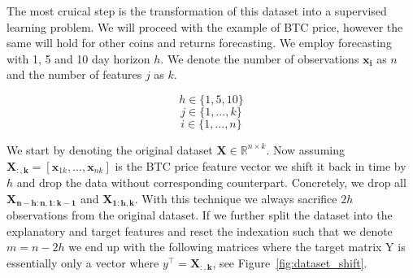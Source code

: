 The most cruical step is the transformation of this dataset into a supervised
learning problem. We will proceed with the example of BTC price, however
the same will hold for other coins and returns forecasting. We employ
forecasting with 1, 5 and 10 day horizon $h$. We denote the number 
of observations $\mathbf{x_{i}}$
as $n$ and the number of features $j$ as $k$.

\begin{equation}\label{eq:horizon}
    h \in \{1,5,10\}
\end{equation}
\begin{equation}\label{eq:features}
    j \in \{1,...,k\}
\end{equation}
\begin{equation}\label{eq:observations}
    i \in \{1,...,n\}
\end{equation}

We start by denoting
the original dataset $\mathbf{X} \in \mathbb{R}^{n \times k}$.
Now assuming $\mathbf{X_{:,k}} = [\mathbf{x}_{1k},...,\mathbf{x}_{nk}]$ 
is the \ac{BTC} price feature vector we shift it
back in time by $h$ and drop the data without corresponding counterpart. 
Concretely, we drop all 
$\mathbf{X_{n-h:n,1:k-1}}$ and $\mathbf{X_{1:h,k}}$.
With this technique we always sacrifice $2h$ observations from the original dataset.
If we further split the dataset into the explanatory and target features
and reset the indexation such that we denote $m = n-2h$
we end up with the following matrices where the target matrix Y is essentially
only a vector where $y^\top = \mathbf{X_{:,k}}$, see Figure~\ref{fig:dataset_shift}.

